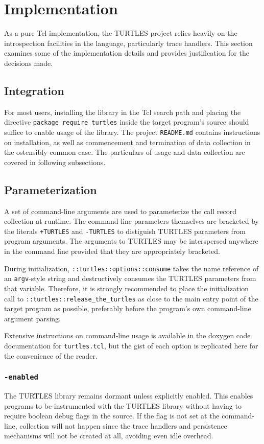 \documentclass{article}[letter,10pt]
\begin{document}
\section{Implementation}{
  As a pure Tcl implementation, the TURTLES project relies heavily on the
  introspection facilities in the language, particularly trace handlers.
  This section examines some of the implementation details and provides
  justification for the decisions made.

  \subsection{Integration}{
    For most users, installing the library in the Tcl search path and placing
    the directive \texttt{package require turtles} inside the target program's source
    should suffice to enable usage of the library. The project \texttt{README.md} contains
    instructions on installation, as well as commencement and termination of data
    collection in the ostensibly common case. The particulars of usage and data collection
    are covered in following subsections.
  }

  \subsection{Parameterization}{
    A set of command-line arguments are used to parameterize the call record collection at runtime.
    The command-line parameters themselves are bracketed by the literals \texttt{+TURTLES} and \texttt{-TURTLES}
    to distiguish TURTLES parameters from program arguments.
    The arguments to TURTLES may be interspersed anywhere in the command line provided that
    they are appropriately bracketed.

    During initialization, \texttt{::turtles::options::consume} takes the name reference of an
    \texttt{argv}-style string and destructively consumes the TURTLES parameters from that variable.
    Therefore, it is strongly recommended to place the initialization call to
    \texttt{::turtles::release\_the\_turtles} as close to the main entry point of the target program
    as possible, preferably before the program's own command-line argument parsing.

    Extensive instructions on command-line usage is available in the doxygen code documentation
    for \texttt{turtles.tcl}, but the gist of each option is replicated here for the convenience of the reader.

    \subsubsection{\texttt{-enabled}}{
      The TURTLES library remains dormant unless explicitly enabled. This enables programs to
      be instrumented with the TURTLES library without having to require boolean debug flags
      in the source. If the flag is not set at the command-line, collection will not happen
      since the trace handlers and persistence mechanisms will not be created at all, avoiding
      even idle overhead.
    }
}}
\end{document}
